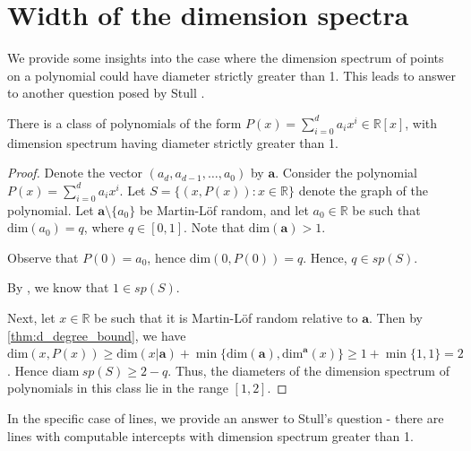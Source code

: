 \documentclass[a4paper,UKenglish,cleveref,autoref,thm-restate]{lipics-v2021}
\newcommand{\diam}{\mathrm{diam}}
\renewcommand{\dim}{{\mathrm{dim}}}
\begin{document}
\section{Width of the dimension spectra}

We provide some insights into the case where the dimension spectrum of
points on a polynomial could have diameter strictly greater than 1.
This leads to answer to another question posed by Stull
\cite{Stull2022}.

\begin{lemma}\label{lem:width}
  There is a class of polynomials of the form
  $P(x)=\sum_{i=0}^da_ix^i\in\mathbb{R}[x]$, with dimension spectrum
  having diameter strictly greater than 1.
\end{lemma}
\begin{proof}
  Denote the vector $(a_d,a_{d-1},\ldots,a_0)$ by $\mathbf{a}$.
  Consider the polynomial $P(x)=\sum_{i=0}^da_ix^i$. Let
  $S=\{(x,P(x)):x\in\mathbb{R}\}$ denote the graph of the polynomial.
  Let $\mathbf{a}\setminus \{a_0\}$ be Martin-L\"of random, and let
  $a_0\in\mathbb{R}$ be such that $\dim(a_0)=q$, where $q\in [0,1]$.
  Note that $\dim(\mathbf{a})>1$.
	
  Observe that $P(0)=a_0$, hence $\dim(0,P(0))=q$. Hence,
  $q\in sp(S)$.
	
  By \cite{Turetsky2011}, we know that $1\in sp(S)$.
	
  Next, let $x\in\mathbb{R}$ be such that it is Martin-L\"of random
  relative to $\mathbf{a}$. Then by \cref{thm:d_degree_bound}, we have
  $\dim(x,P(x)) \ge \dim(x|\mathbf{a}) +
  \min\{\dim(\mathbf{a}),\dim^{\mathbf{a}}(x)\} \ge 1+\min\{1,1\} =2$.
  Hence $\diam\ sp(S) \ge 2-q$. Thus, the diameters of the dimension
  spectrum of polynomials in this class lie in the range $[1,2]$.
\end{proof}

In the specific case of lines, we provide an answer to Stull's
question - there are lines with computable intercepts with dimension
spectrum greater than 1.
\end{document}
